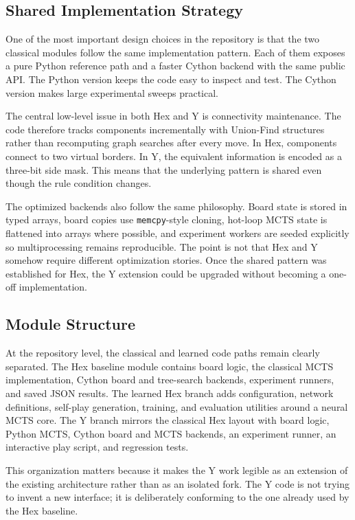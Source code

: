 \documentclass[11pt,a4paper]{article}
\begin{document}
\subsection{Shared Implementation Strategy}

One of the most important design choices in the repository is that the two
classical modules follow the same implementation pattern. Each of them exposes a
pure Python reference path and a faster Cython backend with the same public
API. The Python version keeps the code easy to inspect and test. The Cython
version makes large experimental sweeps practical.

The central low-level issue in both Hex and Y is connectivity maintenance. The
code therefore tracks components incrementally with Union-Find structures rather
than recomputing graph searches after every move. In Hex, components connect to
two virtual borders. In Y, the equivalent information is encoded as a three-bit
side mask. This means that the underlying pattern is shared even though the
rule condition changes.

The optimized backends also follow the same philosophy. Board state is stored
in typed arrays, board copies use \texttt{memcpy}-style cloning, hot-loop MCTS
state is flattened into arrays where possible, and experiment workers are
seeded explicitly so multiprocessing remains reproducible. The point is not
that Hex and Y somehow require different optimization stories. Once the shared
pattern was established for Hex, the Y extension could be upgraded without
becoming a one-off implementation.

\subsection{Module Structure}

At the repository level, the classical and learned code paths remain clearly
separated. The Hex baseline module contains board logic, the classical MCTS
implementation, Cython board and tree-search backends, experiment runners, and
saved JSON results. The learned Hex branch adds configuration, network
definitions, self-play generation, training, and evaluation utilities around a
neural MCTS core. The Y branch mirrors the classical Hex layout with board
logic, Python MCTS, Cython board and MCTS backends, an experiment runner, an
interactive play script, and regression tests.

This organization matters because it makes the Y work legible as an extension
of the existing architecture rather than as an isolated fork. The Y code is not
trying to invent a new interface; it is deliberately conforming to the one
already used by the Hex baseline.
\end{document}
